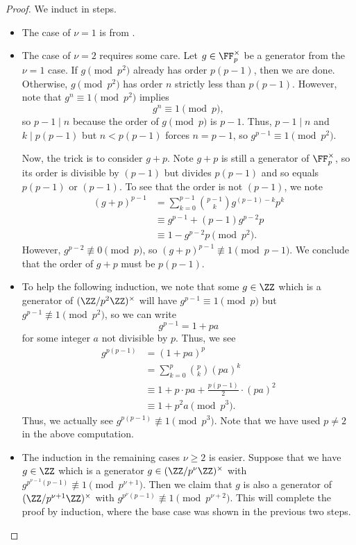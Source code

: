 \documentclass[../notes.tex]{subfiles}
\begin{document}
\begin{proof}
	We induct in steps.
	\begin{itemize}
		\item The case of $\nu=1$ is from .

		\item The case of $\nu=2$ requires some care. Let $g\in\FF_p^\times$ be a generator from the $\nu=1$ case. If $g\pmod{p^2}$ already has order $p(p-1)$, then we are done. Otherwise, $g\pmod{p^2}$ has order $n$ strictly less than $p(p-1)$. However, note that $g^n\equiv1\pmod{p^2}$ implies
		\[g^n\equiv1\pmod p,\]
		so $p-1\mid n$ because the order of $g\pmod p$ is $p-1$. Thus, $p-1\mid n$ and $k\mid p(p-1)$ but $n<p(p-1)$ forces $n=p-1$, so $g^{p-1}\equiv1\pmod{p^2}$.

		Now, the trick is to consider $g+p$. Note $g+p$ is still a generator of $\FF_p^\times$, so its order is divisible by $(p-1)$ but divides $p(p-1)$ and so equals $p(p-1)$ or $(p-1)$. To see that the order is not $(p-1)$, we note
		\begin{align*}
			(g+p)^{p-1} &= \sum_{k=0}^{p-1}\binom{p-1}kg^{(p-1)-k}p^k \\
			&\equiv g^{p-1}+(p-1)g^{p-2}p \\
			&\equiv 1-g^{p-2}p\pmod{p^2}.
		\end{align*}
		However, $g^{p-2}\not\equiv0\pmod p$, so $(g+p)^{p-1}\not\equiv1\pmod{p-1}$. We conclude that the order of $g+p$ must be $p(p-1)$.

		\item To help the following induction, we note that some $g\in\ZZ$ which is a generator of $(\ZZ/p^2\ZZ)^\times$ will have $g^{p-1}\equiv1\pmod p$ but $g^{p-1}\not\equiv1\pmod{p^2}$, so we can write
		\[g^{p-1}=1+pa\]
		for some integer $a$ not divisible by $p$. Thus, we see
		\begin{align*}
			g^{p(p-1)} &= (1+pa)^p \\
			&= \sum_{k=0}^p\binom pk(pa)^k \\
			&\equiv 1+p\cdot pa+\frac{p(p-1)}2\cdot(pa)^2 \\
			&\equiv 1+p^2a\pmod{p^3}.
		\end{align*}
		Thus, we actually see $g^{p(p-1)}\not\equiv1\pmod{p^3}$. Note that we have used $p\ne2$ in the above computation.

		\item The induction in the remaining cases $\nu\ge2$ is easier. Suppose that we have $g\in\ZZ$ which is a generator $g\in(\ZZ/p^\nu\ZZ)^\times$ with $g^{p^{\nu-1}(p-1)}\not\equiv1\pmod{p^{\nu+1}}$. Then we claim that $g$ is also a generator of $(\ZZ/p^{\nu+1}\ZZ)^\times$ with $g^{p^{\nu}(p-1)}\not\equiv1\pmod{p^{\nu+2}}$. This will complete the proof by induction, where the base case was shown in the previous two steps.


\end{itemize}
\end{proof}
\end{document}
